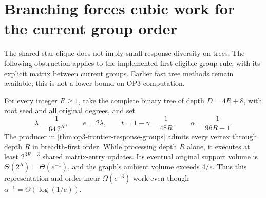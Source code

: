 \section{Branching forces cubic work for the current group order}
\label{sec:op3-group-branching-obstruction}

The shared star clique does not imply small response diversity on trees.
The following obstruction applies to the implemented first-eligible-group
rule, with its explicit matrix between current groups. Earlier fast tree
methods remain available; this is not a lower bound on OP3 computation.

\begin{theorem}
\label{thm:op3-grouped-binary-cubic}
For every integer $R\geq1$, take the complete binary tree of depth
$D=4R+8$, with root seed and all original degrees, and set
\[
 \lambda=\frac1{64\,2^R},\qquad e=2\lambda,\qquad
 t=1-\gamma=\frac1{48R},\qquad \alpha=\frac1{96R-1}.
\]
The producer in \cref{thm:op3-frontier-response-groups} admits every vertex
through depth $R$ in breadth-first order. While processing depth $R$
alone, it executes at least $2^{3R-3}$ shared matrix-entry updates.
Its eventual original support volume is $\Theta(2^R)=\Theta(e^{-1})$,
and the graph's ambient volume exceeds $4/e$. Thus this representation and
order incur $\Omega(e^{-3})$ work even though
$\alpha^{-1}=\Theta(\log(1/e))$.
\end{theorem}
